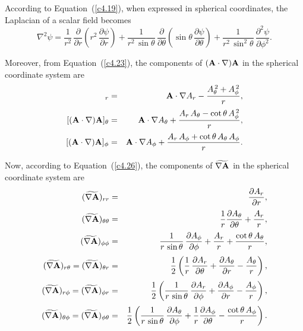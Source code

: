 According to Equation~(\ref{c4.19}), when expressed in spherical coordinates, the Laplacian of a scalar field becomes
\begin{equation}
\nabla^2 \psi= \frac{1}{r^2}\,\frac{\partial}{\partial r}\left(r^2\,\frac{\partial \psi}{\partial r}\right) + \frac{1}{r^2\,\sin\theta}\,\frac{\partial }{\partial\theta}\left(\sin\theta\,\frac{\partial \psi}{\partial \theta}\right) + \frac{1}{r^2\,\sin^2\theta}\,\frac{\partial^2 \psi}{\partial \phi^2}.
\end{equation}

Moreover, from  Equation~(\ref{c4.23}), the components of $({\bf A}\cdot\nabla){\bf A}$ in the spherical coordinate system are
\begin{eqnarray}
[({\bf A}\cdot\nabla){\bf A}]_r&=& {\bf A}\cdot\nabla A_r - \frac{A_\theta^{\,2}+A_\phi^{\,2}}{r},\\[0.5ex]
[({\bf A}\cdot\nabla){\bf A}]_\theta&=& {\bf A}\cdot\nabla A_\theta + \frac{A_r\,A_\theta-\cot\theta\,A_\phi^{\,2}}{r},\\[0.5ex]
[({\bf A}\cdot\nabla){\bf A}]_\phi&=& {\bf A}\cdot\nabla A_\phi+ \frac{A_r\,A_\phi+\cot\theta\,A_\theta\,A_\phi}{r}.
\end{eqnarray}

Now, according to Equation~(\ref{c4.26}), the components of $\widetilde{\nabla {\bf A}}$ in the spherical
coordinate system are 
\begin{eqnarray}
(\widetilde{\nabla {\bf A}})_{rr} &=& \frac{\partial A_r}{\partial r},\\[0.5ex]
(\widetilde{\nabla {\bf A}})_{\theta\theta} &=&\frac{1}{r} \frac{\partial A_\theta}{\partial \theta}+ \frac{A_r}{r},\\[0.5ex]
(\widetilde{\nabla {\bf A}})_{\phi\phi} &=& \frac{1}{r\,\sin\theta}\,\frac{\partial A_\phi}{\partial \phi}+ \frac{A_r}{r} + \frac{\cot\theta\,A_\theta}{r},\\[0.5ex]
(\widetilde{\nabla {\bf A}})_{r\theta}=(\widetilde{\nabla {\bf A}})_{\theta r} &=& \frac{1}{2}\left(\frac{1}{r}\,\frac{\partial A_r}{\partial\theta} + \frac{\partial A_\theta}{\partial r} - \frac{A_\theta}{r}\right),\\[0.5ex]
(\widetilde{\nabla {\bf A}})_{r\phi}=(\widetilde{\nabla {\bf A}})_{\phi r} &=&\frac{1}{2}\left(\frac{1}{r\,\sin\theta}\,\frac{\partial A_r}{\partial \phi} + \frac{\partial A_\phi}{\partial r}-\frac{A_\phi}{r}\right),\\[0.5ex]
(\widetilde{\nabla {\bf A}})_{\theta \phi}=(\widetilde{\nabla {\bf A}})_{\phi\theta} &=&\frac{1}{2}\left(\frac{1}{r\,\sin\theta}\,\frac{\partial A_\theta}{\partial \phi} + \frac{1}{r}\frac{\partial A_\phi}{\partial \theta}-\frac{\cot\theta\,A_\phi}{r}\right).
\end{eqnarray}

